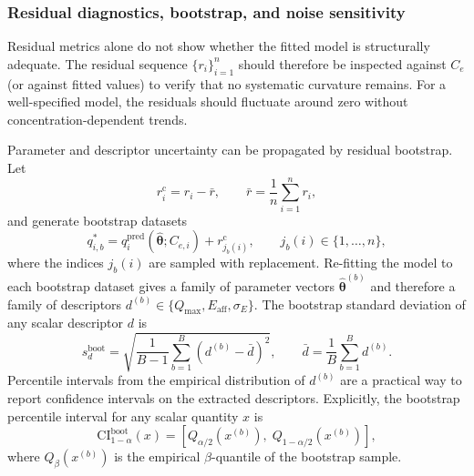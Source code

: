 \documentclass[journal=aamick,manuscript=article]{achemso}
\begin{document}
\subsubsection{Residual diagnostics, bootstrap, and noise sensitivity}

Residual metrics alone do not show whether the fitted model is
structurally adequate. The residual sequence
$\{r_i\}_{i=1}^{n}$ should therefore be inspected against $C_e$ (or
against fitted values) to verify that no systematic curvature remains.
For a well-specified model, the residuals should fluctuate around zero
without concentration-dependent trends.

Parameter and descriptor uncertainty can be propagated by residual
bootstrap. Let
\begin{equation}
	r_i^{\mathrm{c}} = r_i - \bar{r},
	\qquad
	\bar{r} = \frac{1}{n}\sum_{i=1}^{n} r_i,
	\label{eq:si_centered_residuals}
\end{equation}
and generate bootstrap datasets
\begin{equation}
	q_{i,b}^{\ast}
	=
	q_i^{\mathrm{pred}}(\hat{\boldsymbol{\theta}}; C_{e,i})
	+
	r_{j_b(i)}^{\mathrm{c}},
	\qquad
	j_b(i) \in \{1,\dots,n\},
	\label{eq:si_bootstrap_dataset}
\end{equation}
where the indices $j_b(i)$ are sampled with replacement. Re-fitting the
model to each bootstrap dataset gives a family of parameter vectors
$\hat{\boldsymbol{\theta}}^{(b)}$ and therefore a family of descriptors
$d^{(b)} \in \{Q_{\max}, E_{\mathrm{aff}}, \sigma_E\}$. The bootstrap
standard deviation of any scalar descriptor $d$ is
\begin{equation}
	s_d^{\mathrm{boot}}
	=
	\sqrt{
	\frac{1}{B-1}
	\sum_{b=1}^{B}
	\left(d^{(b)} - \bar{d}\right)^2},
	\qquad
	\bar{d} = \frac{1}{B}\sum_{b=1}^{B} d^{(b)}.
	\label{eq:si_bootstrap_sd}
\end{equation}
Percentile intervals from the empirical distribution of $d^{(b)}$ are a
practical way to report confidence intervals on the extracted
descriptors.
Explicitly, the bootstrap percentile interval for any scalar quantity
$x$ is
\begin{equation}
	\mathrm{CI}^{\mathrm{boot}}_{1-\alpha}(x)
	=
	\left[
	Q_{\alpha/2}\!\left(x^{(b)}\right),\;
	Q_{1-\alpha/2}\!\left(x^{(b)}\right)
	\right],
	\label{eq:si_bootstrap_CI}
\end{equation}
where $Q_{\beta}(x^{(b)})$ is the empirical $\beta$-quantile of the
bootstrap sample.
\end{document}
